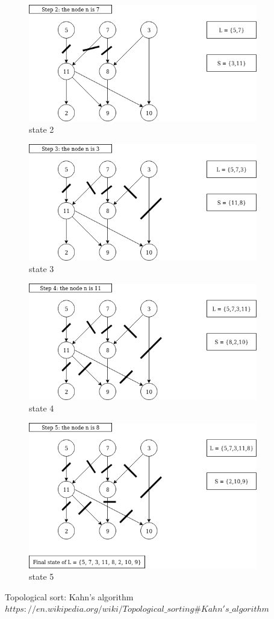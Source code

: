 \documentclass[12pt]{article}
\begin{document}
\begin{figure}[H]
\centering
\includegraphics[width=100mm]{khanAlgoStep3.png}
\caption{state 2}
\end{figure}

\begin{figure}[H]
\centering
\includegraphics[width=100mm]{khanAlgoStep4.png}
\caption{state 3}
\end{figure}
    
    
    \begin{figure}[H]
\centering
\includegraphics[width=100mm]{khanAlgoStep5.png}
\caption{state 4 }
\end{figure}

\begin{figure}[H]
\centering
\includegraphics[width=100mm]{khanAlgoStep6.png}
\caption{state 5}
\end{figure}
    
    


\begin{thebibliography}{1}
Topological sort: Kahn's algorithm
\\\texttt{$https://en.wikipedia.org/wiki/Topological\_sorting\#Kahn's\_algorithm$}

\end{thebibliography}
\end{document}
